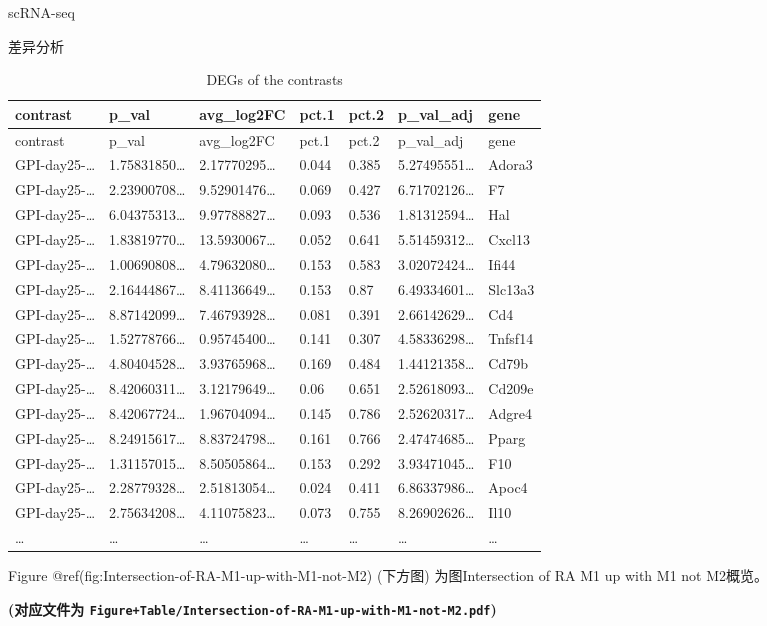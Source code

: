 \documentclass[
  ignorenonframetext,
]{beamer}
\begin{document}
\begin{frame}[fragile]{scRNA-seq}
\begin{block}{差异分析}
\begin{longtable}[]{@{}lllllll@{}}
\caption{DEGs of the contrasts}\tabularnewline
\toprule
contrast & p\_val & avg\_log2FC & pct.1 & pct.2 & p\_val\_adj &
gene\tabularnewline
\midrule
\endfirsthead
\toprule
contrast & p\_val & avg\_log2FC & pct.1 & pct.2 & p\_val\_adj &
gene\tabularnewline
\midrule
\endhead
GPI-day25-\ldots{} & 1.75831850\ldots{} & 2.17770295\ldots{} & 0.044 &
0.385 & 5.27495551\ldots{} & Adora3\tabularnewline
GPI-day25-\ldots{} & 2.23900708\ldots{} & 9.52901476\ldots{} & 0.069 &
0.427 & 6.71702126\ldots{} & F7\tabularnewline
GPI-day25-\ldots{} & 6.04375313\ldots{} & 9.97788827\ldots{} & 0.093 &
0.536 & 1.81312594\ldots{} & Hal\tabularnewline
GPI-day25-\ldots{} & 1.83819770\ldots{} & 13.5930067\ldots{} & 0.052 &
0.641 & 5.51459312\ldots{} & Cxcl13\tabularnewline
GPI-day25-\ldots{} & 1.00690808\ldots{} & 4.79632080\ldots{} & 0.153 &
0.583 & 3.02072424\ldots{} & Ifi44\tabularnewline
GPI-day25-\ldots{} & 2.16444867\ldots{} & 8.41136649\ldots{} & 0.153 &
0.87 & 6.49334601\ldots{} & Slc13a3\tabularnewline
GPI-day25-\ldots{} & 8.87142099\ldots{} & 7.46793928\ldots{} & 0.081 &
0.391 & 2.66142629\ldots{} & Cd4\tabularnewline
GPI-day25-\ldots{} & 1.52778766\ldots{} & 0.95745400\ldots{} & 0.141 &
0.307 & 4.58336298\ldots{} & Tnfsf14\tabularnewline
GPI-day25-\ldots{} & 4.80404528\ldots{} & 3.93765968\ldots{} & 0.169 &
0.484 & 1.44121358\ldots{} & Cd79b\tabularnewline
GPI-day25-\ldots{} & 8.42060311\ldots{} & 3.12179649\ldots{} & 0.06 &
0.651 & 2.52618093\ldots{} & Cd209e\tabularnewline
GPI-day25-\ldots{} & 8.42067724\ldots{} & 1.96704094\ldots{} & 0.145 &
0.786 & 2.52620317\ldots{} & Adgre4\tabularnewline
GPI-day25-\ldots{} & 8.24915617\ldots{} & 8.83724798\ldots{} & 0.161 &
0.766 & 2.47474685\ldots{} & Pparg\tabularnewline
GPI-day25-\ldots{} & 1.31157015\ldots{} & 8.50505864\ldots{} & 0.153 &
0.292 & 3.93471045\ldots{} & F10\tabularnewline
GPI-day25-\ldots{} & 2.28779328\ldots{} & 2.51813054\ldots{} & 0.024 &
0.411 & 6.86337986\ldots{} & Apoc4\tabularnewline
GPI-day25-\ldots{} & 2.75634208\ldots{} & 4.11075823\ldots{} & 0.073 &
0.755 & 8.26902626\ldots{} & Il10\tabularnewline
\ldots{} & \ldots{} & \ldots{} & \ldots{} & \ldots{} & \ldots{} &
\ldots{}\tabularnewline
\bottomrule
\end{longtable}

Figure @ref(fig:Intersection-of-RA-M1-up-with-M1-not-M2) (下方图)
为图Intersection of RA M1 up with M1 not M2概览。

\textbf{(对应文件为
\texttt{Figure+Table/Intersection-of-RA-M1-up-with-M1-not-M2.pdf})}


\end{block}
\end{frame}
\end{document}
